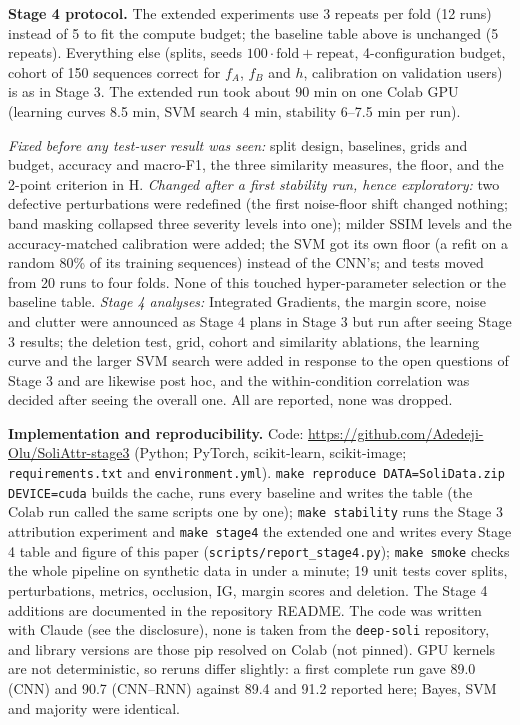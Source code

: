 \documentclass[11pt]{article}
\begin{document}
\textbf{Stage 4 protocol.} The extended experiments use 3 repeats per fold (12 runs) instead of 5 to fit the compute budget; the baseline table above is unchanged (5 repeats). Everything else (splits, seeds $100\cdot\text{fold}+\text{repeat}$, 4-configuration budget, cohort of 150 sequences correct for $f_A$, $f_B$ and $h$, calibration on validation users) is as in Stage 3. The extended run took about 90 min on one Colab GPU (learning curves 8.5 min, SVM search 4 min, stability 6--7.5 min per run).

\emph{Fixed before any test-user result was seen:} split design, baselines, grids and budget, accuracy and macro-F1, the three similarity measures, the floor, and the 2-point criterion in H. \emph{Changed after a first stability run, hence exploratory:} two defective perturbations were redefined (the first noise-floor shift changed nothing; band masking collapsed three severity levels into one); milder SSIM levels and the accuracy-matched calibration were added; the SVM got its own floor (a refit on a random 80\% of its training sequences) instead of the CNN's; and tests moved from 20 runs to four folds. None of this touched hyper-parameter selection or the baseline table. \emph{Stage 4 analyses:} Integrated Gradients, the margin score, noise and clutter were announced as Stage 4 plans in Stage 3 but run after seeing Stage 3 results; the deletion test, grid, cohort and similarity ablations, the learning curve and the larger SVM search were added in response to the open questions of Stage 3 and are likewise post hoc, and the within-condition correlation was decided after seeing the overall one. All are reported, none was dropped.

\textbf{Implementation and reproducibility.}\label{sec:repro} Code: \url{https://github.com/Adedeji-Olu/SoliAttr-stage3} (Python; PyTorch, scikit-learn, scikit-image; \texttt{requirements.txt} and \texttt{environment.yml}). \texttt{make reproduce DATA=SoliData.zip DEVICE=cuda} builds the cache, runs every baseline and writes the table (the Colab run called the same scripts one by one); \texttt{make stability} runs the Stage 3 attribution experiment and \texttt{make stage4} the extended one and writes every Stage 4 table and figure of this paper (\texttt{scripts/report\_stage4.py}); \texttt{make smoke} checks the whole pipeline on synthetic data in under a minute; 19 unit tests cover splits, perturbations, metrics, occlusion, IG, margin scores and deletion. The Stage 4 additions are documented in the repository README. The code was written with Claude (see the disclosure), none is taken from the \texttt{deep-soli} repository, and library versions are those pip resolved on Colab (not pinned). GPU kernels are not deterministic, so reruns differ slightly: a first complete run gave 89.0 (CNN) and 90.7 (CNN--RNN) against 89.4 and 91.2 reported here; Bayes, SVM and majority were identical.
\end{document}
